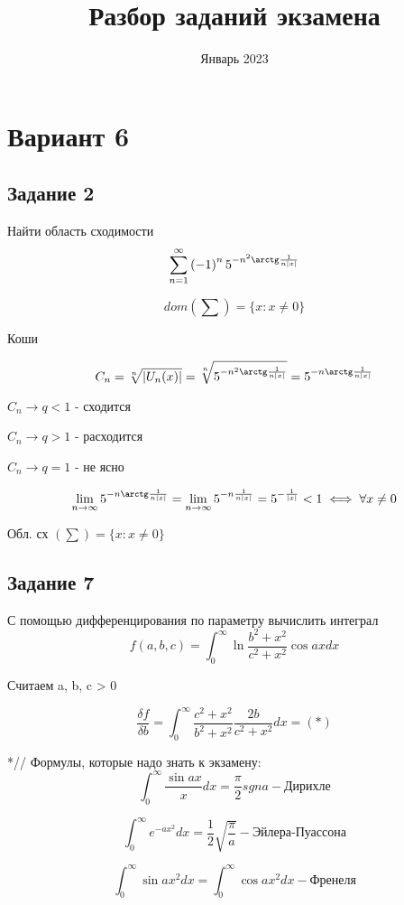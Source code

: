 \documentclass[12pt]{report}
\title{Разбор заданий экзамена}
\date{Январь 2023}
\begin{document}
	\maketitle
	
	\chapter{Вариант 6}
	
	\section{Задание 2}
	Найти область сходимости
	$$
	\sum_{n=1}^{\infty}
	\left(-1 \right)^{n}
	5^{-n^{2}
		\arctg \frac{1}{n|x|}}
	$$
	
	$$
	dom (\sum) = 
	\{x : x \neq 0\}
	$$
	
	Коши
	
	$$
	C_n =
	\sqrt[n]{\left|U_n(x)\right|} = 
	\sqrt[n]{5^{-n^{2}
			\arctg \frac{1}{n|x|}}} = 
	5^{-n \arctg \frac{1}{n|x|}}
	$$
	
	$C_n \rightarrow q < 1$ - сходится
	
	
	$C_n \rightarrow q > 1$ - расходится
	
	
	$C_n \rightarrow q = 1$ - не ясно
	
	$$
	\lim_{n \rightarrow \infty}
	5^{-n \arctg \frac{1}{n|x|}} = 
	\lim_{n \rightarrow \infty}
	5^{-n \frac{1}{n|x|}} = 
	5^{-\frac{1}{|x|}} < 1 \iff
	\forall x \neq 0
	$$
	
	Обл. сх $\left(\sum\right) = \{x : x \neq 0\}$
	\newpage
	
	\section{Задание 7}
	С помощью дифференцирования по параметру вычислить интеграл
	$$f
	(a, b, c) =
	\int_{0}^{\infty}
	\ln
	\frac{b^{2} + x^{2}}{c^{2} + x^{2}}
	\cos ax dx
	$$
	
	Считаем a, b, c > 0
	
	$$
	\frac{\delta f}{\delta b} = 
	\int_{0}^{\infty}
	\frac{c^{2} + x^{2}}{b^{2} + x^{2}}
	\frac{2b}{c^{2} + x^{2}} dx =
	(*)
	$$
	
	*// Формулы, которые надо знать к экзамену:
	$$
	\int_{0}^{\infty}
	\frac{\sin ax}{x} dx = 
	\frac{\pi}{2} sgn a
	- \textbf{Дирихле}
	$$
	
	$$
	\int_{0}^{\infty}
	e^{-ax^{2}} dx =
	\frac{1}{2}
	\sqrt{\frac{\pi}{a}}
	- \textbf{Эйлера-Пуассона}
	$$
	
	$$
	\int_{0}^{\infty}
	\sin ax^{2} dx =
	\int_{0}^{\infty}
	\cos ax^{2} dx
	- \textbf{Френеля}
	$$
	
\end{document}
